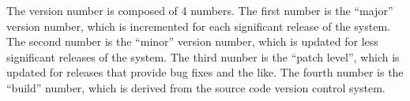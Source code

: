 The version number is composed of 4 numbers.
The first number is the ``major'' version number, which is incremented for each significant release of the system.
The second number is the ``minor'' version number, which is updated for less significant releases of the system.
The third number is the ``patch level'', which is updated for releases that provide bug fixes and the like.
The fourth number is the ``build'' number, which is derived from the source code version control system.